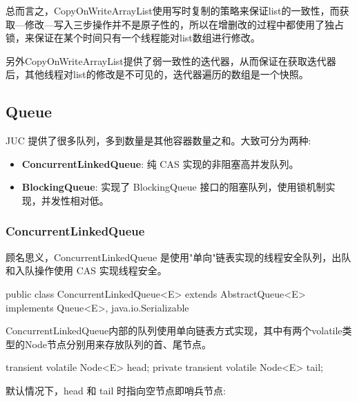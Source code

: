 总而言之，CopyOnWriteArrayList使用写时复制的策略来保证list的一致性，而获取—修改—写入三步操作并不是原子性的，所以在增删改的过程中都使用了独占锁，来保证在某个时间只有一个线程能对list数组进行修改。

另外CopyOnWriteArrayList提供了弱一致性的迭代器，从而保证在获取迭代器后，其他线程对list的修改是不可见的，迭代器遍历的数组是一个快照。


\subsection{Queue}

JUC 提供了很多队列，多到数量是其他容器数量之和。大致可分为两种:
\begin{itemize}
    \item \textbf{ConcurrentLinkedQueue}: 纯 CAS 实现的非阻塞高并发队列。
    \item \textbf{BlockingQueue}: 实现了 BlockingQueue 接口的阻塞队列，使用锁机制实现，并发性相对低。
\end{itemize}

\subsubsection{ConcurrentLinkedQueue}

顾名思义，ConcurrentLinkedQueue 是使用"单向"链表实现的线程安全队列，出队和入队操作使用 CAS 实现线程安全。

\begin{Java}
public class ConcurrentLinkedQueue<E> extends AbstractQueue<E> implements Queue<E>, java.io.Serializable
\end{Java}

ConcurrentLinkedQueue内部的队列使用单向链表方式实现，其中有两个volatile类型的Node节点分别用来存放队列的首、尾节点。

\begin{Java}
transient volatile Node<E> head;
private transient volatile Node<E> tail;
\end{Java}

默认情况下，head 和 tail 时指向空节点即哨兵节点:

